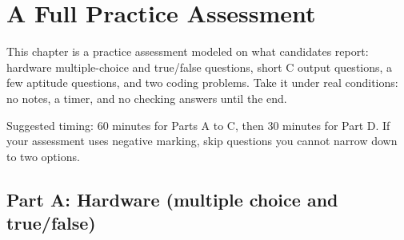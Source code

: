 \chapter{A Full Practice Assessment}
\label{ch:exam}

This chapter is a practice assessment modeled on what candidates report: hardware multiple-choice and true/false questions, short C output questions, a few aptitude questions, and two coding problems. Take it under real conditions: no notes, a timer, and no checking answers until the end.

\begin{remember}
Suggested timing: 60 minutes for Parts A to C, then 30 minutes for Part D. If your assessment uses negative marking, skip questions you cannot narrow down to two options.
\end{remember}

\newcommand{\opts}[4]{\par\hspace*{1em}(a) #1\quad (b) #2\quad (c) #3\quad (d) #4}

\section{Part A: Hardware (multiple choice and true/false)}

